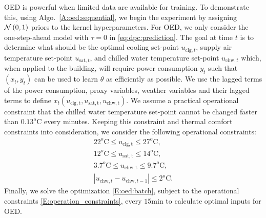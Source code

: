 OED is powerful when limited data are available for training. 
To demonstrate this, using Algo.~\ref{A:oed:sequential}, we begin the experiment by assigning \(\operatorname*{\mathcal{N}}\left(0, 1\right)\) priors to the kernel hyperparameters. %
For OED, we only consider the one-step-ahead model with \(\tau=0\) in \eqref{eq:dpc:prediction}.
The goal at time \(t\) is to determine what should be the optimal cooling set-point \(u_{\mathrm{clg},t}\), supply air temperature set-point \(u_{\mathrm{sat},t}\), and chilled water temperature set-point \(u_{\mathrm{chw},t}\) which, when applied to the building, will require power consumption \(y_t\) such that \((x_t,y_t)\) can be used to learn \(\theta\) as efficiently as possible.
We use the lagged terms of the power consumption, proxy variables, weather variables and their lagged terms to define \(x_t(u_{\mathrm{clg,t}},u_{\mathrm{sat,t}},u_{\mathrm{chw,t}})\).
We assume a practical operational constraint that the chilled water temperature set-point cannot be changed faster than \(0.13^o\mathrm{C}\) every minutes.
Keeping this constraint and thermal comfort constraints into consideration, we consider the following operational constraints:
\begin{gather}
22^o\mathrm{C} \leq u_{\mathrm{clg,t}} \leq  27^o\mathrm{C}, \nonumber \\
12^o\mathrm{C} \leq u_{\mathrm{sat,t}} \leq  14^o\mathrm{C}, \nonumber \\
 3.7^o\mathrm{C} \leq u_{\mathrm{chw,t}} \leq  9.7^o\mathrm{C},\label{E:operation_constraints} \\
| u_{\mathrm{chw},t} - u_{\mathrm{chw},t-1}| \leq  2^o\mathrm{C}. \nonumber
\end{gather}
Finally, we solve the optimization \eqref{E:oed:batch}, subject to the operational constraints \eqref{E:operation_constraints}, every \(15 \mathrm{min}\) to calculate optimal inputs for OED.

